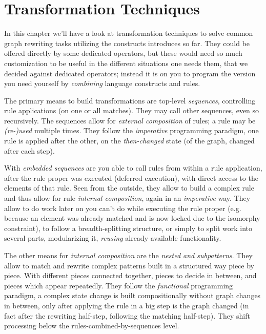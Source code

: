 \chapter{Transformation Techniques}
\label{cha:techniques}
\label{sub:mergesplit}

In this chapter we'll have a look at transformation techniques to solve common graph rewriting tasks utilizing the constructs introduces so far.
They could be offered directly by some dedicated operators,
but these would need so much customization to be useful in the different situations one needs them,
that we decided against dedicated operators;
instead it is on you to program the version you need yourself by \emph{combining} language constructs and rules.

The primary means to build transformations are top-level \emph{sequences}, controlling rule applications (on one or all matches).
They may call other sequences, even so recursively.
The sequences allow for \emph{external composition} of rules; a rule may be \emph{(re-)used} multiple times.
They follow the \emph{imperative} programming paradigm, one rule is applied after the other, on the \emph{then-changed} state (of the graph, changed after each step).

With \emph{embedded sequences} are you able to call rules from within a rule application, after the rule proper was executed (deferred execution), with direct access to the elements of that rule.
Seen from the outside, they allow to build a complex rule and thus allow for rule \emph{internal composition}, again in an \emph{imperative} way.
They allow to do work later on you can't do while executing the rule proper (e.g. because an element was already matched and is now locked due to the isomorphy constraint), to follow a breadth-splitting structure, or simply to split work into several parts, modularizing it, \emph{reusing} already available functionality.

The other means for \emph{internal composition} are the \emph{nested and subpatterns}.
They allow to match and rewrite complex patterns built in a structured way piece by piece.
With different pieces connected together, pieces to decide in between, and pieces which appear repeatedly.
They follow the \emph{functional} programming paradigm, a complex state change is built compositionally without graph changes in between, only after applying the rule in a big step is the graph changed (in fact after the rewriting half-step, following the matching half-step). 
They shift processing below the rules-combined-by-sequences level. 

